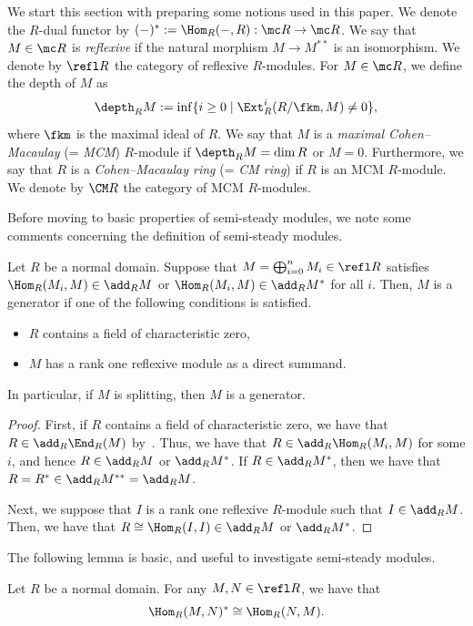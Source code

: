 We start this section with preparing some notions used in this paper. We denote the $R$-dual functor by $(-)^*:=\Hom_R(-, R) : \mc R\rightarrow \mc R$. We say that $M\in \mc R$ is \emph{reflexive} if the natural morphism $M\rightarrow M^{**}$ is an isomorphism. We denote by $\refl R$ the category of reflexive $R$-modules. For $M\in\mc R$, we define the depth of $M$ as
\[
\depth_RM:=\mathrm{inf} \{ i\ge0 \mid \Ext^i_R(R/\fkm, M)\neq 0\},
\]
where $\fkm$ is the maximal ideal of $R$. We say that $M$ is a \emph{maximal Cohen--Macaulay} (= \emph{MCM}) $R$-module if $\depth_RM=\dim R$ or $M=0$. Furthermore, we say that $R$ is a \emph{Cohen--Macaulay ring} (= \emph{CM ring}) if $R$ is an MCM $R$-module. We denote by $\CM R$ the category of MCM $R$-modules.


Before moving to basic properties of semi-steady modules, we note some comments concerning the definition of semi-steady modules.

\goodbreak
\begin{lemm}\label{prop_semisteady}
Let $R$ be a normal domain. Suppose that $M=\bigoplus_{i=0}^nM_i\in\refl R$ satisfies $\Hom_R(M_i,M)\in\add_RM$ or $\Hom_R(M_i,M)\in\add_RM^*$ for all $i$. Then, $M$ is a generator if one of the following conditions is satisfied.
\begin{itemize}%
\item $R$ contains a field of characteristic zero,
\item $M$ has a rank one reflexive module as a direct summand.
\end{itemize}
In particular, if $M$ is splitting, then $M$ is a generator.
\end{lemm}

\begin{proof}
First, if $R$ contains a field of characteristic zero, we have that $R\in\add_R\End_R(M)$ by~\cite[5.6]{Aus3}. Thus, we have that $R\in\add_R\Hom_R(M_i,M)$ for some $i$, and hence $R\in\add_RM$ or $\add_RM^*$. If $R\in\add_RM^*$, then we have that $R=R^*\in\add_RM^{**}=\add_RM$.

Next, we suppose that $I$ is a rank one reflexive $R$-module such that $I\in\add_R M$. Then, we have that $R\cong\Hom_R(I, I)\in\add_RM$ or $\add_RM^*$.
\end{proof}

The following lemma is basic, and useful to investigate semi-steady modules.

\begin{lemm}\label{basic_lem_ref}
Let $R$ be a normal domain. For any $M, N\in\refl R$, we have that
\[
\Hom_R(M,N)^*\cong\Hom_R(N,M).
\]
\end{lemm}

